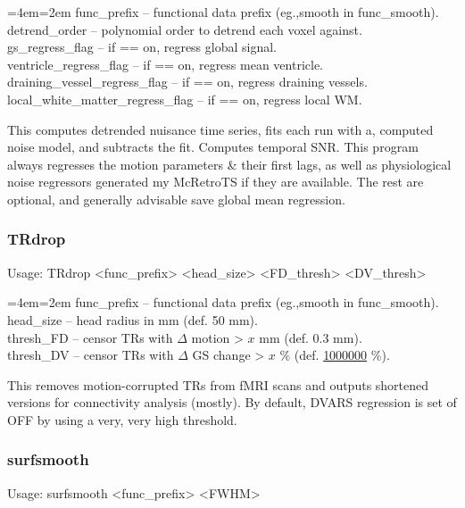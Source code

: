 \documentclass[final,titlepage,letterpaper,oneside,12pt]{article}
\renewcommand{\texttt}[2][BrickRed]{\textcolor{#1}{\ttfamily #2}}%
\newenvironment{blockquote}{%
  \par%
  \medskip
  \leftskip=4em\rightskip=2em%
  \noindent\ignorespaces}{%
  \par\medskip}
\begin{document}
\begin{blockquote}
func\_prefix -- functional data prefix (eg.,smooth in func\_smooth). \\
detrend\_order -- polynomial order to detrend each voxel against. \\
gs\_regress\_flag -- if == on, regress global signal. \\
ventricle\_regress\_flag -- if == on, regress mean ventricle. \\
draining\_vessel\_regress\_flag -- if == on, regress draining vessels. \\
local\_white\_matter\_regress\_flag -- if == on, regress local WM. \

\end{blockquote}

\noindent This computes detrended nuisance time series, fits each run with a, computed noise model, and subtracts the fit. Computes temporal SNR. This program always regresses the motion parameters \& their first lags, as well as physiological noise regressors generated my McRetroTS if they are available. The rest are optional, and generally advisable save global mean regression.

\subsubsection{TRdrop}
Usage: \texttt{TRdrop <func\_prefix> <head\_size> <FD\_thresh> <DV\_thresh>}

\begin{blockquote}
func\_prefix -- functional data prefix (eg.,smooth in func\_smooth). \\
head\_size -- head radius in mm (def. 50 mm). \\
thresh\_FD -- censor TRs with $\Delta$ motion > $x$ mm (def. 0.3 mm). \\
thresh\_DV -- censor TRs with $\Delta$ GS change > $x$ \% (def. \href{http://upload.wikimedia.org/wikipedia/en/1/16/Drevil_million_dollars.jpg}{1000000} \%). \
\end{blockquote}

\noindent This removes motion-corrupted TRs from fMRI scans and outputs shortened versions for connectivity analysis (mostly). By default, DVARS regression is set of OFF by using a very, very high threshold.

\subsubsection{surfsmooth}
Usage: \texttt{surfsmooth <func\_prefix> <FWHM>}
\end{document}
